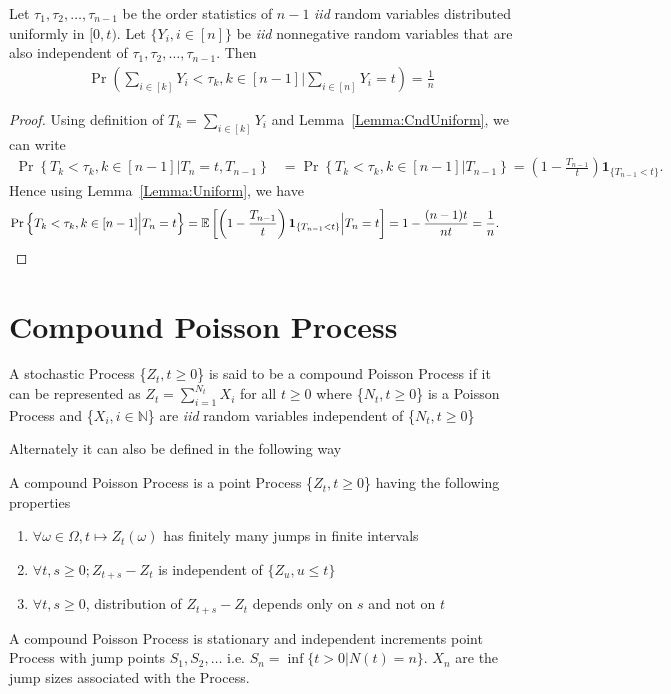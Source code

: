 \documentclass[a4paper,english,10pt]{article}
\begin{document}
\begin{lem}
\label{Lemma:Final}
Let $\tau_1, \tau_2, \ldots, \tau_{n-1}$ be the order statistics of $n-1$ \emph{iid} random variables distributed uniformly in $[0,t)$. Let $\{Y_i,i\in [n]\}$	be \emph{iid} nonnegative random variables that are also independent of $\tau_1, \tau_2, \ldots, \tau_{n-1}$. Then
\begin{align*}
\Pr(\sum_{i \in [k]}Y_i < \tau_k,k \in [n-1] |\sum_{i \in [n]}Y_i=t)=\frac{1}{n}
\end{align*}
\end{lem}
\begin{proof} Using definition of $T_k = \sum_{i \in [k]}Y_i$ and Lemma~\ref{Lemma:CndUniform}, we can write
\begin{align*}
\Pr\left\{ T_k<\tau_k ,k \in [n-1] \Big| T_n=t, T_{n-1} \right\}
&= \Pr\left\{T_k<\tau_k,k \in [n-1] \Big| T_{n-1}\right\}=\left(1-\frac{T_{n-1}}{t}\right) \textbf{1}_{\{T_{n-1} < t\}}.
\end{align*}
Hence using Lemma~\ref{Lemma:Uniform}, we have
\begin{align*}
\Pr\left\{T_k<\tau_k,k \in [n-1] \Big| T_n=t\right\} &= \mathbb{E}\left[\left(1-\frac{T_{n-1}}{t}\right) \textbf{1}_{\{T_{n-1} < t\}} \Big|T_n=t\right] = 1-\frac{(n-1)t}{nt} =\frac{1}{n}.
\end{align*}
\end{proof}

\section{Compound Poisson Process}
\begin{defn}
A stochastic Process \{$Z_t,t \geq 0$\}	 is said to be a compound Poisson Process if it can be represented as $Z_t=\sum_{i=1}^{N_t}X_i$ for all $t\geq 0$ where \{$N_t,t\geq 0$\} is a Poisson Process and \{$X_i, i\in \mathbb{N}$\} are \emph{iid} random variables independent of \{$N_t, t\geq 0$\}
\end{defn}
Alternately it can also be defined in the following way
\begin{defn}
A compound Poisson Process is a point Process \{$Z_t,t \geq 0$\} having the following properties
\begin{enumerate}
	\item $\forall \omega \in \Omega, t \longmapsto Z_t(\omega)$ has finitely many jumps in finite intervals
	\item $\forall t,s \geq 0; Z_{t+s}-Z_t$ is independent of $\{Z_u, u\leq t\}$
	\item $\forall t,s \geq 0$, distribution of $Z_{t+s}-Z_t$ depends only on $s$ and not on $t$
\end{enumerate}	
\end{defn}
A compound Poisson Process is stationary and independent increments point Process with jump points $S_1,S_2,\ldots$ i.e. $S_n=\inf \{t>0 | N(t)=n\}$. $X_n$ are the jump sizes associated with the Process.\\
\end{document}
